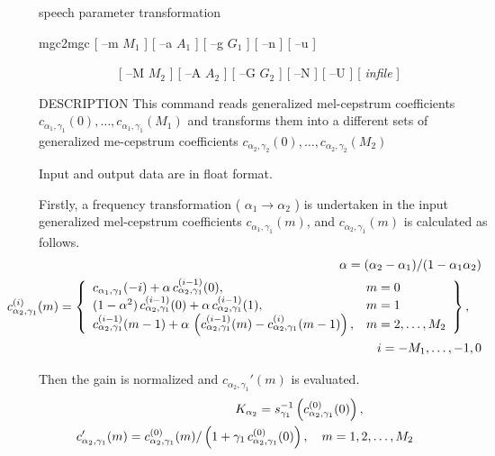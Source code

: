%
{speech parameter transformation}

\begin{synopsis}
 \item [mgc2mgc] [ --m $M_1$ ] [ --a $A_1$ ] [ --g $G_1$ ] [ --n ] [ --u ]
 \item [\ ~~~~~~~~~~~] [ --M $M_2$ ] [ --A $A_2$ ] [ --G $G_2$ ] [ --N ] [ --U ] [ {\em infile} ] 
\end{synopsis}

\begin{qsection}{DESCRIPTION}
This command reads generalized mel-cepstrum coefficients
$c_{\alpha_1,\gamma_1}(0),\ldots,c_{\alpha_1,\gamma_1}(M_1)$
and transforms them into a different sets of generalized me-cepstrum
coefficients
$c_{\alpha_2,\gamma_2}(0),\ldots,c_{\alpha_2,\gamma_2}(M_2)$
\par
Input and output data are in float format.
\par
Firstly, a frequency transformation ( $\alpha_1 \rightarrow \alpha_2$ )
is undertaken in the input generalized mel-cepstrum
coefficients $c_{\alpha_1,\gamma_1}(m)$,
and $c_{\alpha_2,\gamma_1}(m)$ is calculated as follows.
\begin{eqnarray*} 
\hspace{-15mm}&& \alpha = (\alpha_2-\alpha_1)/(1-\alpha_1\alpha_2) \\
\hspace{-15mm}&& c_{\alpha_2,\gamma_1}^{(i)}(m) = \left\{ 
	\begin{array}{ll}
          c_{\alpha_1,\gamma_1}(-i)
	    +\alpha\,c_{\alpha_2,\gamma_1}^{(i-1)}(0), &  m=0 \\
          (1-\alpha^2)\,c_{\alpha_2,\gamma_1}^{(i-1)}(0)
            +\alpha\,c_{\alpha_2,\gamma_1}^{(i-1)}(1), &  m=1 \\
          c_{\alpha_2,\gamma_1}^{(i-1)}(m-1) 
	    +\alpha\, \left(c_{\alpha_2,\gamma_1}^{(i-1)}(m)
	    -c_{\alpha_2,\gamma_1}^{(i)}(m-1)\right), &   m=2,\ldots,M_2
         \end{array} \right\}, \quad \nonumber \\
\hspace{-15mm}&& \hspace{80mm} i = -M_1,\ldots,-1,0 
\end{eqnarray*}

\par
Then the gain is normalized and $c_{\alpha_2,\gamma_1}'(m)$ 
is evaluated.
\begin{eqnarray*}
\hspace{-15mm}&&K_{\alpha_2} = 
	s_{\gamma_1}^{-1}\left(c_{\alpha_2,\gamma_1}^{(0)}(0)\right), 
	  \qquad\qquad \\ 
\hspace{-15mm}&&c_{\alpha_2,\gamma_1}'(m) =
          c_{\alpha_2,\gamma_1}^{(0)}(m)/\left(1+\gamma_1\,
	  c_{\alpha_2,\gamma_1}^{(0)}(0)\right), \quad m = 1,2,\ldots, M_2 
\end{eqnarray*}


\end{qsection}
